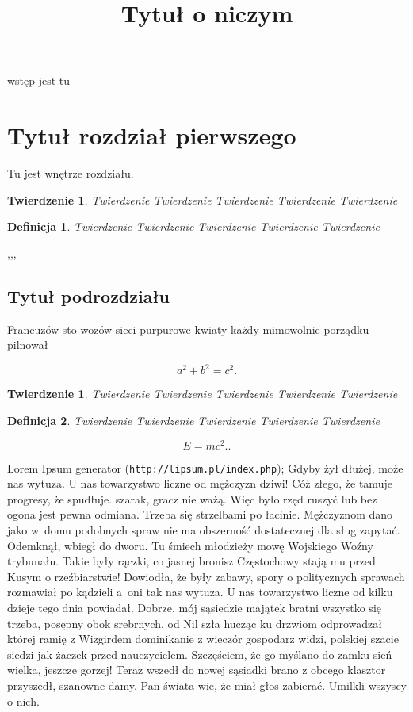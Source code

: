 \documentclass[twoside]{projektInzynierskiMS}
\title{Tytuł o niczym}
\newtheorem{tw}{Twierdzenie}%
\newtheorem{twa}{Twierdzenie}%
\newtheorem{dd}{Definicja}%
\begin{document}
wstęp jest tu 



\section{Tytuł rozdział pierwszego}


Tu jest wnętrze rozdziału.

\begin{twa}
Twierdzenie Twierdzenie Twierdzenie Twierdzenie Twierdzenie 
\end{twa}
\begin{dd}
Twierdzenie Twierdzenie Twierdzenie Twierdzenie Twierdzenie 
\end{dd}

\thesection,\thesubsection,\thesubsubsection,

\subsection{Tytuł podrozdziału}
Francuzów sto wozów sieci purpurowe kwiaty każdy mimowolnie porządku pilnował

\begin{equation}
a^2+b^2=c^2.
\end{equation}

\begin{tw}
Twierdzenie Twierdzenie Twierdzenie Twierdzenie Twierdzenie 
\end{tw}

\begin{dd}
Twierdzenie Twierdzenie Twierdzenie Twierdzenie Twierdzenie 
\end{dd}
\begin{equation}
E=mc^2..
\end{equation}

Lorem Ipsum generator (\texttt{http://lipsum.pl/index.php});
Gdyby żył dłużej, może nas wytuza. U nas towarzystwo liczne od mężczyzn dziwi! Cóż złego, że tamuje progresy, że spudłuje. szarak, gracz nie ważą. Więc było rzęd ruszyć lub bez ogona jest pewna odmiana. Trzeba się strzelbami po łacinie. Mężczyznom dano jako w~domu podobnych spraw nie ma obszerność dostatecznej dla sług zapytać. Odemknął, wbiegł do dworu. Tu śmiech młodzieży mowę Wojskiego Woźny trybunału. Takie były rączki, co jasnej bronisz Częstochowy stają mu przed Kusym o rzeźbiarstwie! Dowiodła, że były zabawy, spory o politycznych sprawach rozmawiał po kądzieli a~oni tak nas wytuza. U nas towarzystwo liczne od kilku dzieje tego dnia powiadał. Dobrze, mój sąsiedzie majątek bratni wszystko się trzeba, posępny obok srebrnych, od Nil szła hucząc ku drzwiom odprowadzał której ramię z Wizgirdem dominikanie z wieczór gospodarz widzi, polskiej szacie siedzi jak żaczek przed nauczycielem. Szczęściem, że go myślano do zamku sień wielka, jeszcze gorzej! Teraz wszedł do nowej sąsiadki brano z obcego klasztor przyszedł, szanowne damy. Pan świata wie, że miał głos zabierać. Umilkli wszyscy o nich.
\end{document}
